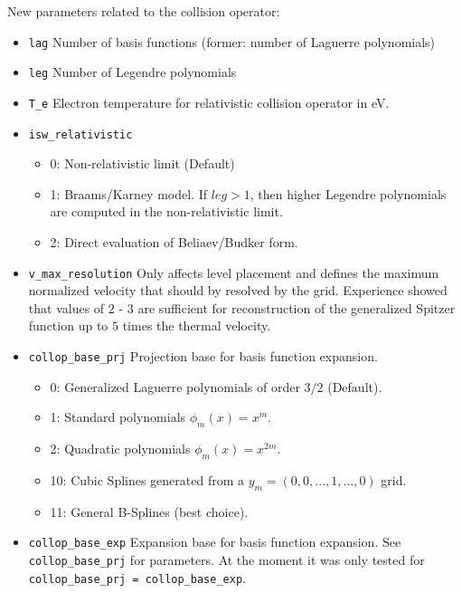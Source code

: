 \documentclass{article}
\begin{document}
New parameters related to the collision operator:
\begin{itemize}
 \item \verb|lag|\newline
 Number of basis functions (former: number of Laguerre polynomials)
 \item \verb|leg|\newline 
 Number of Legendre polynomials
 \item \verb|T_e|\newline 
 Electron temperature for relativistic collision operator in eV.
 \item \verb|isw_relativistic| 
 \begin{itemize}
  \item 0: Non-relativistic limit (Default)
  \item 1: Braams/Karney model. If $leg>1$, then higher Legendre polynomials are computed in the non-relativistic limit. 
  \item 2: Direct evaluation of Beliaev/Budker form.
 \end{itemize}
 \item \verb|v_max_resolution|\newline
 Only affects level placement and defines the maximum normalized velocity that should by resolved by the grid. Experience showed that values of $2$ - $3$ are sufficient for reconstruction of the generalized Spitzer function up to $5$ times the thermal velocity. 
 \item \verb|collop_base_prj|\newline 
 Projection base for basis function expansion. 
 \begin{itemize}
  \item 0: Generalized Laguerre polynomials of order $3/2$ (Default).
  \item 1: Standard polynomials $\phi_m(x) = x^m$.
  \item 2: Quadratic polynomials $\phi_m(x) = x^{2m}$.
  \item 10: Cubic Splines generated from a $y_m = (0, 0, ..., 1, ..., 0)$ grid.
  \item 11: General B-Splines (best choice).
 \end{itemize}

 \item \verb|collop_base_exp|\newline 
 Expansion base for basis function expansion. See \verb|collop_base_prj| for parameters. At the moment it was only tested for \verb|collop_base_prj = collop_base_exp|. 


\end{itemize}
\end{document}
